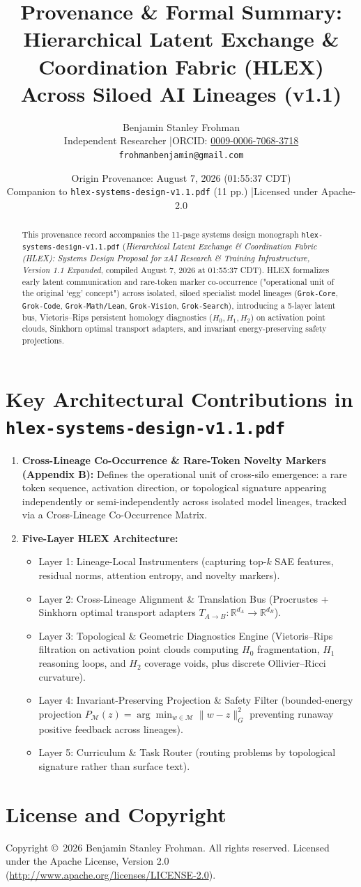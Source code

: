 \documentclass[11pt]{article}
\title{\textbf{Provenance \& Formal Summary: Hierarchical Latent Exchange \& Coordination Fabric (HLEX) Across Siloed AI Lineages (v1.1)}}
\author{Benjamin Stanley Frohman\\
\small Independent Researcher \quad|\quad ORCID: \href{https://orcid.org/0009-0006-7068-3718}{0009-0006-7068-3718}\\
\small \texttt{frohmanbenjamin@gmail.com}}
\date{Origin Provenance: August 7, 2026 (01:55:37 CDT) \\ \small Companion to \texttt{hlex-systems-design-v1.1.pdf} (11 pp.) \quad|\quad Licensed under Apache-2.0}
\begin{document}
\maketitle

\begin{abstract}
This provenance record accompanies the 11-page systems design monograph \texttt{hlex-systems-design-v1.1.pdf} (\emph{Hierarchical Latent Exchange \& Coordination Fabric (HLEX): Systems Design Proposal for xAI Research \& Training Infrastructure, Version 1.1 Expanded}, compiled August 7, 2026 at 01:55:37 CDT). HLEX formalizes early latent communication and rare-token marker co-occurrence ("operational unit of the original `egg' concept") across isolated, siloed specialist model lineages (\texttt{Grok-Core}, \texttt{Grok-Code}, \texttt{Grok-Math/Lean}, \texttt{Grok-Vision}, \texttt{Grok-Search}), introducing a 5-layer latent bus, Vietoris--Rips persistent homology diagnostics ($H_0, H_1, H_2$) on activation point clouds, Sinkhorn optimal transport adapters, and invariant energy-preserving safety projections.
\end{abstract}

\section{Key Architectural Contributions in \texttt{hlex-systems-design-v1.1.pdf}}
\begin{enumerate}
  \item \textbf{Cross-Lineage Co-Occurrence \& Rare-Token Novelty Markers (Appendix B):} Defines the operational unit of cross-silo emergence: a rare token sequence, activation direction, or topological signature appearing independently or semi-independently across isolated model lineages, tracked via a Cross-Lineage Co-Occurrence Matrix.
  \item \textbf{Five-Layer HLEX Architecture:}
    \begin{itemize}
      \item Layer 1: Lineage-Local Instrumenters (capturing top-$k$ SAE features, residual norms, attention entropy, and novelty markers).
      \item Layer 2: Cross-Lineage Alignment \& Translation Bus (Procrustes + Sinkhorn optimal transport adapters $T_{A\to B} : \mathbb{R}^{d_A} \to \mathbb{R}^{d_B}$).
      \item Layer 3: Topological \& Geometric Diagnostics Engine (Vietoris--Rips filtration on activation point clouds computing $H_0$ fragmentation, $H_1$ reasoning loops, and $H_2$ coverage voids, plus discrete Ollivier--Ricci curvature).
      \item Layer 4: Invariant-Preserving Projection \& Safety Filter (bounded-energy projection $P_{\mathcal{M}}(z) = \arg\min_{w\in\mathcal{M}}\|w-z\|_G^2$ preventing runaway positive feedback across lineages).
      \item Layer 5: Curriculum \& Task Router (routing problems by topological signature rather than surface text).
    \end{itemize}
\end{enumerate}

\section*{License and Copyright}
Copyright \copyright\ 2026 Benjamin Stanley Frohman. All rights reserved. Licensed under the Apache License, Version 2.0 (\url{http://www.apache.org/licenses/LICENSE-2.0}).
\end{document}
